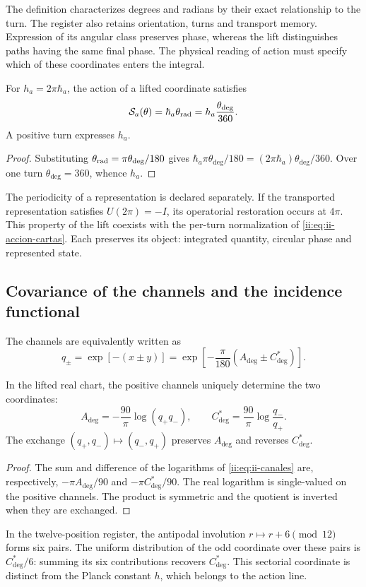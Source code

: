 The definition characterizes degrees and radians by their exact relationship to the turn. The register also retains orientation, turns and transport memory. Expression of its angular class preserves phase, whereas the lift distinguishes paths having the same final phase. The physical reading of action must specify which of these coordinates enters the integral.

\begin{proposition}
For \(h_a=2\pi\hbar_a\), the action of a lifted coordinate
satisfies
\begin{equation}
 \mathcal S_a(\theta)
 =\hbar_a\theta_{\rm rad}
 =h_a\frac{\theta_{\deg}}{360}.
 \label{ii:eq:ii-accion-cartas}
\end{equation}
A positive turn expresses \(h_a\).
\end{proposition}
\begin{proof}
Substituting \(\theta_{\rm rad}=\pi\theta_{\deg}/180\) gives \(\hbar_a\pi\theta_{\deg}/180
=(2\pi\hbar_a)\theta_{\deg}/360\). Over one turn \(\theta_{\deg}=360\), whence \(h_a\).
\end{proof}

The periodicity of a representation is declared separately. If the transported representation satisfies \(U(2\pi)=-I\), its operatorial restoration occurs at \(4\pi\). This property of the lift coexists with the per-turn normalization of \eqref{ii:eq:ii-accion-cartas}. Each preserves its object: integrated quantity, circular phase and represented state.

\subsection{Covariance of the channels and the incidence functional}

The channels are equivalently written as
\begin{equation}
 q_\pm=\exp[-(x\pm y)]
 =\exp\!\left[-\frac{\pi}{180}(A_{\deg}\pm C^*_{\deg})\right].
\label{ii:eq:ii-canales}
\end{equation}
\begin{proposition}
\label{ii:prop:ii-inversion-canales-angulares} In the lifted real chart, the positive channels uniquely determine the two coordinates:
\[
 A_{\deg}=-\frac{90}{\pi}\log(q_+q_-),\qquad
 C^*_{\deg}=\frac{90}{\pi}\log\frac{q_-}{q_+}.
\]
The exchange \((q_+,q_-)\mapsto(q_-,q_+)\) preserves \(A_{\deg}\) and reverses \(C^*_{\deg}\).
\end{proposition}
\begin{proof}
The sum and difference of the logarithms of \eqref{ii:eq:ii-canales} are, respectively, \(-\pi A_{\deg}/90\) and \(-\pi C^*_{\deg}/90\). The real logarithm is single-valued on the positive channels. The product is symmetric and the quotient is inverted when they are exchanged.
\end{proof}
In the twelve-position register, the antipodal involution \(r\mapsto r+6\pmod {12}\) forms six pairs. The uniform distribution of the odd coordinate over these pairs is \(C^*_{\deg}/6\): summing its six contributions recovers \(C^*_{\deg}\). This sectorial coordinate is distinct from the Planck constant \(h\), which belongs to the action line.

